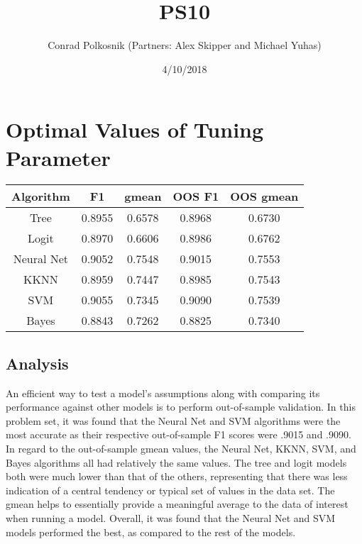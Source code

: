 \documentclass{article}
\title{PS10}
\author{Conrad Polkosnik (Partners: Alex Skipper and Michael Yuhas)}
\date{4/10/2018}
\begin{document}
\maketitle

\section{Optimal Values of Tuning Parameter}
\begin{table}[h!]
\centering
 \begin{tabular}{||c c c c c||}
 \hline
 Algorithm & F1 & gmean & OOS F1 & OOS gmean \\ [0.5ex]
 \hline\hline
 Tree & 0.8955 & 0.6578 & 0.8968 & 0.6730\\
 Logit & 0.8970 & 0.6606 & 0.8986 & 0.6762\\
 Neural Net & 0.9052 & 0.7548 & 0.9015 & 0.7553\\
 KKNN & 0.8959 & 0.7447 & 0.8985 & 0.7543\\
 SVM & 0.9055 & 0.7345 & 0.9090 & 0.7539\\
 Bayes & 0.8843 & 0.7262 & 0.8825 & 0.7340\\ [1ex]
\hline

\end{tabular}
\end{table}
\subsection{Analysis}
An efficient way to test a model's assumptions along with comparing its performance against other models is to perform out-of-sample validation. In this problem set, it was found that the Neural Net and SVM algorithms were the most accurate as their respective out-of-sample F1 scores were .9015 and .9090. In regard to the out-of-sample gmean values, the Neural Net, KKNN, SVM, and Bayes algorithms all had relatively the same values. The tree and logit models both were much lower than that of the others, representing that there was less indication of a central tendency or typical set of values in the data set. The gmean helps to essentially provide a meaningful average to the data of interest when running a model. Overall, it was found that the Neural Net and SVM models performed the best, as compared to the rest of the models.
\end{document}

